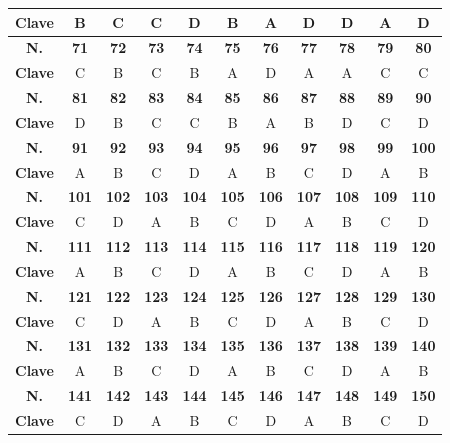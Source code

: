 \begin{center}
\begin{tabular}{|c|c|c|c|c|c|c|c|c|c|c|}
\hline
\textbf{Clave} & B & C & C & D & B & A & D & D & A & D \\
\hline
\textbf{N.} & \textbf{71} & \textbf{72} & \textbf{73} & \textbf{74} & \textbf{75} & \textbf{76} & \textbf{77} & \textbf{78} & \textbf{79} & \textbf{80} \\
\hline
\textbf{Clave} & C & B & C & B & A & D & A & A & C & C \\
\hline
\textbf{N.} & \textbf{81} & \textbf{82} & \textbf{83} & \textbf{84} & \textbf{85} & \textbf{86} & \textbf{87} & \textbf{88} & \textbf{89} & \textbf{90} \\
\hline
\textbf{Clave} & D & B & C & C & B & A & B & D & C & D \\
\hline
\textbf{N.} & \textbf{91} & \textbf{92} & \textbf{93} & \textbf{94} & \textbf{95} & \textbf{96} & \textbf{97} & \textbf{98} & \textbf{99} & \textbf{100} \\
\hline
\textbf{Clave} & A & B & C & D & A & B & C & D & A & B \\
\hline
\textbf{N.} & \textbf{101} & \textbf{102} & \textbf{103} & \textbf{104} & \textbf{105} & \textbf{106} & \textbf{107} & \textbf{108} & \textbf{109} & \textbf{110} \\
\hline
\textbf{Clave} & C & D & A & B & C & D & A & B & C & D \\
\hline
\textbf{N.} & \textbf{111} & \textbf{112} & \textbf{113} & \textbf{114} & \textbf{115} & \textbf{116} & \textbf{117} & \textbf{118} & \textbf{119} & \textbf{120} \\
\hline
\textbf{Clave} & A & B & C & D & A & B & C & D & A & B \\
\hline
\textbf{N.} & \textbf{121} & \textbf{122} & \textbf{123} & \textbf{124} & \textbf{125} & \textbf{126} & \textbf{127} & \textbf{128} & \textbf{129} & \textbf{130} \\
\hline
\textbf{Clave} & C & D & A & B & C & D & A & B & C & D \\
\hline
\textbf{N.} & \textbf{131} & \textbf{132} & \textbf{133} & \textbf{134} & \textbf{135} & \textbf{136} & \textbf{137} & \textbf{138} & \textbf{139} & \textbf{140} \\
\hline
\textbf{Clave} & A & B & C & D & A & B & C & D & A & B \\
\hline
\textbf{N.} & \textbf{141} & \textbf{142} & \textbf{143} & \textbf{144} & \textbf{145} & \textbf{146} & \textbf{147} & \textbf{148} & \textbf{149} & \textbf{150} \\
\hline
\textbf{Clave} & C & D & A & B & C & D & A & B & C & D \\

\end{tabular}
\end{center}
